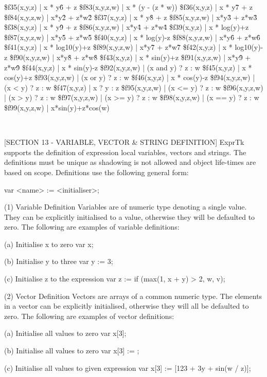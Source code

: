 \$f35(x,y,z) | x * y\^6 + z       \$f83(x,y,z,w) | x * (y - (z * w))
\$f36(x,y,z) | x * y\^7 + z       \$f84(x,y,z,w) | x*y\^2 + z*w\^2
\$f37(x,y,z) | x * y\^8 + z       \$f85(x,y,z,w) | x*y\^3 + z*w\^3
\$f38(x,y,z) | x * y\^9 + z       \$f86(x,y,z,w) | x*y\^4 + z*w\^4
\$f39(x,y,z) | x * log(y)+z      \$f87(x,y,z,w) | x*y\^5 + z*w\^5
\$f40(x,y,z) | x * log(y)-z      \$f88(x,y,z,w) | x*y\^6 + z*w\^6
\$f41(x,y,z) | x * log10(y)+z    \$f89(x,y,z,w) | x*y\^7 + z*w\^7
\$f42(x,y,z) | x * log10(y)-z    \$f90(x,y,z,w) | x*y\^8 + z*w\^8
\$f43(x,y,z) | x * sin(y)+z      \$f91(x,y,z,w) | x*y\^9 + z*w\^9
\$f44(x,y,z) | x * sin(y)-z      \$f92(x,y,z,w) | (x and y) ? z : w
\$f45(x,y,z) | x * cos(y)+z      \$f93(x,y,z,w) | (x or  y) ? z : w
\$f46(x,y,z) | x * cos(y)-z      \$f94(x,y,z,w) | (x <   y) ? z : w
\$f47(x,y,z) | x ? y : z         \$f95(x,y,z,w) | (x <=  y) ? z : w
\$f96(x,y,z,w) | (x >   y) ? z : w
\$f97(x,y,z,w) | (x >=  y) ? z : w
\$f98(x,y,z,w) | (x ==  y) ? z : w
\$f99(x,y,z,w) | x*sin(y)+z*cos(w)

~~~~~~~~~~~~~~~~~~~~~~~~~~~~~~~~~~~~~~~~~~~~~~~~~~~~~~~~~~

[SECTION 13 - VARIABLE, VECTOR \& STRING DEFINITION]
ExprTk supports the definition of expression local variables,  vectors
and  strings.  The definitions  must  be unique  as  shadowing is  not
allowed and object life-times are based on scope. Definitions use  the
following general form:

var <name> := <initialiser>;

(1) Variable Definition
Variables are  of numeric  type denoting  a single  value. They can be
explicitly initialised to a value, otherwise they will be defaulted to
zero. The following are examples of variable definitions:

(a) Initialise x to zero
var x;

(b) Initialise y to three
var y := 3;

(c) Initialise z to the expression
var z := if (max(1, x + y) > 2, w, v);


(2) Vector Definition
Vectors are arrays of a common numeric type. The elements in a  vector
can be explicitly initialised, otherwise they will all be defaulted to
zero. The following are examples of vector definitions:

(a) Initialise all values to zero
var x[3];

(b) Initialise all values to zero
var x[3] := {};

(c) Initialise all values to given expression
var x[3] := [123 + 3y + sin(w / z)];

